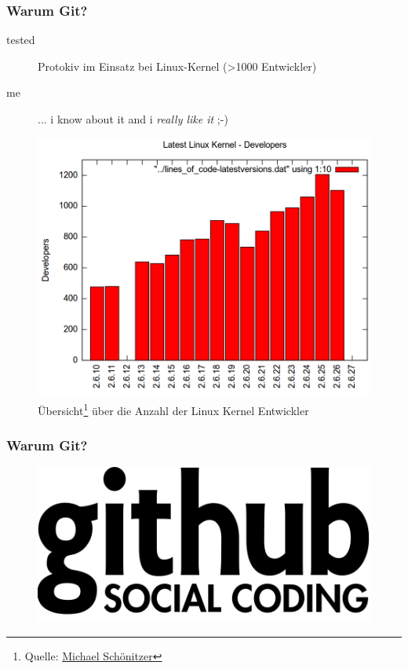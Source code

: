 \documentclass{beamer}
\begin{document}
\begin{frame}\frametitle{Warum Git?}
\begin{description}
\item[tested] Protokiv im Einsatz bei Linux-Kernel (>1000 Entwickler)
\item[me] ... i know about it and i \textit{really like it} ;-)
\end{description}

\begin{figure}
\includegraphics[scale=0.2]{Bilder/kernel_Entwickler} 
\caption{Übersicht\footnote{Quelle: \href{http://www.schoenitzer.de/lks/lks.html\#new_developers}{Michael Schönitzer}} über die Anzahl der Linux Kernel Entwickler}
\end{figure}
\end{frame}

\begin{frame}\frametitle{Warum Git?}


\begin{figure}
\href{http://github.com}{
\includegraphics[scale=0.7]{Bilder/github.png} 
}
\end{figure}
\end{frame}
\end{document}
